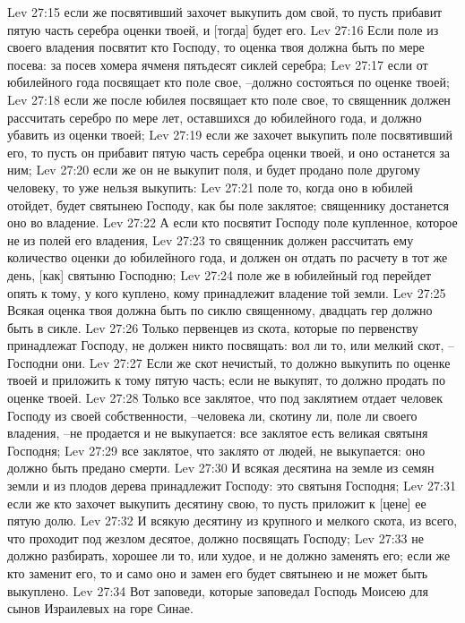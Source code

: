 Lev 27:15  если же посвятивший захочет выкупить дом свой, то пусть прибавит пятую часть серебра оценки твоей, и [тогда] будет его.
Lev 27:16  Если поле из своего владения посвятит кто Господу, то оценка твоя должна быть по мере посева: за посев хомера ячменя пятьдесят сиклей серебра;
Lev 27:17  если от юбилейного года посвящает кто поле свое, --должно состояться по оценке твоей;
Lev 27:18  если же после юбилея посвящает кто поле свое, то священник должен рассчитать серебро по мере лет, оставшихся до юбилейного года, и должно убавить из оценки твоей;
Lev 27:19  если же захочет выкупить поле посвятивший его, то пусть он прибавит пятую часть серебра оценки твоей, и оно останется за ним;
Lev 27:20  если же он не выкупит поля, и будет продано поле другому человеку, то уже нельзя выкупить:
Lev 27:21  поле то, когда оно в юбилей отойдет, будет святынею Господу, как бы поле заклятое; священнику достанется оно во владение.
Lev 27:22  А если кто посвятит Господу поле купленное, которое не из полей его владения,
Lev 27:23  то священник должен рассчитать ему количество оценки до юбилейного года, и должен он отдать по расчету в тот же день, [как] святыню Господню;
Lev 27:24  поле же в юбилейный год перейдет опять к тому, у кого куплено, кому принадлежит владение той земли.
Lev 27:25  Всякая оценка твоя должна быть по сиклю священному, двадцать гер должно быть в сикле.
Lev 27:26  Только первенцев из скота, которые по первенству принадлежат Господу, не должен никто посвящать: вол ли то, или мелкий скот, --Господни они.
Lev 27:27  Если же скот нечистый, то должно выкупить по оценке твоей и приложить к тому пятую часть; если не выкупят, то должно продать по оценке твоей.
Lev 27:28  Только все заклятое, что под заклятием отдает человек Господу из своей собственности, --человека ли, скотину ли, поле ли своего владения, --не продается и не выкупается: все заклятое есть великая святыня Господня;
Lev 27:29  все заклятое, что заклято от людей, не выкупается: оно должно быть предано смерти.
Lev 27:30  И всякая десятина на земле из семян земли и из плодов дерева принадлежит Господу: это святыня Господня;
Lev 27:31  если же кто захочет выкупить десятину свою, то пусть приложит к [цене] ее пятую долю.
Lev 27:32  И всякую десятину из крупного и мелкого скота, из всего, что проходит под жезлом десятое, должно посвящать Господу;
Lev 27:33  не должно разбирать, хорошее ли то, или худое, и не должно заменять его; если же кто заменит его, то и само оно и замен его будет святынею и не может быть выкуплено.
Lev 27:34  Вот заповеди, которые заповедал Господь Моисею для сынов Израилевых на горе Синае.


